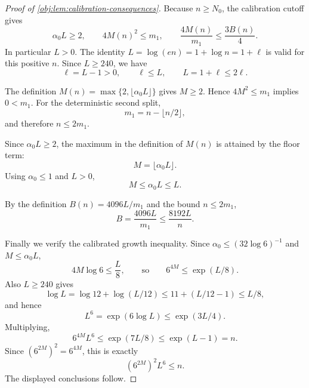 \begin{proof}[Proof of \cref{obj:lem:calibration-consequences}]
Because \(n\ge N_0\), the calibration cutoff gives
\[
\alpha_0L\ge2,\qquad
4M(n)^2\le m_1,\qquad
\frac{4M(n)}{m_1}\le \frac{3B(n)}4.
\]
In particular \(L>0\). The identity \(L=\log(en)=1+\log n=1+\ell\) is valid for this positive \(n\). Since \(L\ge240\), we have
\[
\ell=L-1>0,\qquad \ell\le L,\qquad L=1+\ell\le2\ell. %
\]

The definition \(M(n)=\max\{2,\lfloor\alpha_0L\rfloor\}\) gives \(M\ge2\). Hence \(4M^2\le m_1\) implies \(0<m_1\). For the deterministic second split,
\[
m_1=n-\lfloor n/2\rfloor,
\]
and therefore \(n\le2m_1\). %

Since \(\alpha_0L\ge2\), the maximum in the definition of \(M(n)\) is attained by the floor term:
\[
M=\lfloor\alpha_0L\rfloor.
\]
Using \(\alpha_0\le1\) and \(L>0\),
\[
M\le \alpha_0L\le L. %
\]

By the definition \(B(n)=4096L/m_1\) and the bound \(n\le2m_1\),
\[
B=\frac{4096L}{m_1}
\le
\frac{8192L}{n}. %
\]

Finally we verify the calibrated growth inequality. Since \(\alpha_0\le(32\log6)^{-1}\) and \(M\le\alpha_0L\),
\[
4M\log6\le \frac{L}{8},
\qquad\text{so}\qquad
6^{4M}\le \exp(L/8).
\]
Also \(L\ge240\) gives
\[
\log L=\log 12+\log(L/12)
\le 11+(L/12-1)\le L/8,
\]
and hence
\[
L^6=\exp(6\log L)\le \exp(3L/4).
\]
Multiplying,
\[
6^{4M}L^6\le \exp(7L/8)\le \exp(L-1)=n.
\]
Since \((6^{2M})^2=6^{4M}\), this is exactly
\[
(6^{2M})^2L^6\le n. %
\]
The displayed conclusions follow. %
\end{proof}
